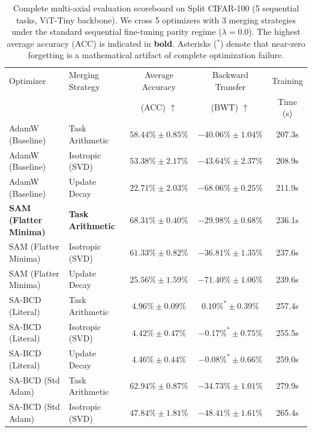\begin{table}[t]
  \caption{Complete multi-axial evaluation scoreboard on Split CIFAR-100 (5 sequential tasks, ViT-Tiny backbone). We cross 5 optimizers with 3 merging strategies under the standard sequential fine-tuning parity regime ($\lambda = 0.0$). The highest average accuracy (ACC) is indicated in \textbf{bold}. Asterisks ($^{*}$) denote that near-zero forgetting is a mathematical artifact of complete optimization failure.}
  \label{tab:scoreboard}
  \vskip 0.15in
  \begin{center}
  \begin{small}
  \begin{sc}
  \setlength{\tabcolsep}{6pt}
  \begin{tabular}{llccc}
    \toprule
    Optimizer & Merging Strategy & Average Accuracy & Backward Transfer & Training \\
    & & (ACC) $\uparrow$ & (BWT) $\uparrow$ & Time (s) \\
    \midrule
    AdamW (Baseline) & Task Arithmetic & $58.44\% \pm 0.85\%$ & $-40.06\% \pm 1.04\%$ & 207.3s \\
    AdamW (Baseline) & Isotropic (SVD) & $53.38\% \pm 2.17\%$ & $-43.64\% \pm 2.37\%$ & 208.9s \\
    AdamW (Baseline) & Update Decay & $22.71\% \pm 2.03\%$ & $-68.06\% \pm 0.25\%$ & 211.9s \\
    \midrule
    \textbf{SAM (Flatter Minima)} & \textbf{Task Arithmetic} & \textbf{$68.31\% \pm 0.40\%$} & \textbf{$-29.98\% \pm 0.68\%$} & 236.1s \\
    SAM (Flatter Minima) & Isotropic (SVD) & $61.33\% \pm 0.82\%$ & $-36.81\% \pm 1.35\%$ & 237.6s \\
    SAM (Flatter Minima) & Update Decay & $25.56\% \pm 1.59\%$ & $-71.40\% \pm 1.06\%$ & 239.6s \\
    \midrule
    SA-BCD (Literal) & Task Arithmetic & $4.96\% \pm 0.09\%$ & $0.10\%^{*} \pm 0.39\%$ & 257.4s \\
    SA-BCD (Literal) & Isotropic (SVD) & $4.42\% \pm 0.47\%$ & $-0.17\%^{*} \pm 0.75\%$ & 255.5s \\
    SA-BCD (Literal) & Update Decay & $4.46\% \pm 0.44\%$ & $-0.08\%^{*} \pm 0.66\%$ & 259.0s \\
    \midrule
    SA-BCD (Std Adam) & Task Arithmetic & $62.94\% \pm 0.87\%$ & $-34.73\% \pm 1.01\%$ & 279.9s \\
    SA-BCD (Std Adam) & Isotropic (SVD) & $47.84\% \pm 1.81\%$ & $-48.41\% \pm 1.61\%$ & 265.4s \\

\end{tabular}
\end{sc}
\end{small}
\end{center}
\end{table}
